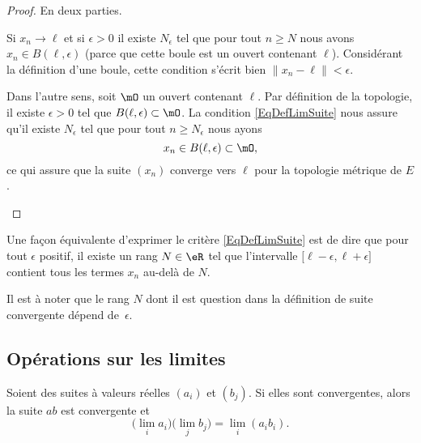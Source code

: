 \begin{proof}
	En deux parties.
	\begin{subproof}
		Si \( x_n\to \ell\) et si \( \epsilon>0\) il existe \( N_{\epsilon}\) tel que pour tout \( n\geq N\) nous avons \( x_n\in B(\ell,\epsilon)\) (parce que cette boule est un ouvert contenant \( \ell\)). Considérant la définition d'une boule, cette condition s'écrit bien \( \| x_n-\ell \|<\epsilon\).

		Dans l'autre sens, soit \( \mO\) un ouvert contenant \( \ell\). Par définition de la topologie, il existe \( \epsilon>0\) tel que \( B(\ell,\epsilon)\subset \mO\). La condition \eqref{EqDefLimSuite} nous assure qu'il existe \( N_{\epsilon} \) tel que pour tout \( n\geq N_{\epsilon}\) nous ayons
		\begin{equation}
			x_n\in B(\ell,\epsilon)\subset\mO,
		\end{equation}
		ce qui assure que la suite \( (x_n)\) converge vers \( \ell\) pour la topologie métrique de \( E\).
	\end{subproof}
\end{proof}

Une façon équivalente d'exprimer le critère \eqref{EqDefLimSuite} est de dire que pour tout \( \epsilon\) positif, il existe un rang \( N\in\eR\) tel que l'intervalle \( \mathopen[ \ell-\epsilon , \ell+\epsilon \mathclose]\) contient tous les termes \( x_n\) au-delà de \( N\).

Il est à noter que le rang \( N\) dont il est question dans la définition de suite convergente dépend de~\( \epsilon\).

\subsection{Opérations sur les limites}

\begin{proposition}     \label{PROPooIQOAooJPMoDD}
	Soient des suites à valeurs réelles \( (a_i)\) et \( (b_j)\). Si elles sont convergentes, alors la suite \( ab\) est convergente et
	\begin{equation}
		\big( \lim_ia_i \big)\big( \lim_jb_j \big)=\lim_i(a_ib_i).
	\end{equation}
\end{proposition}

